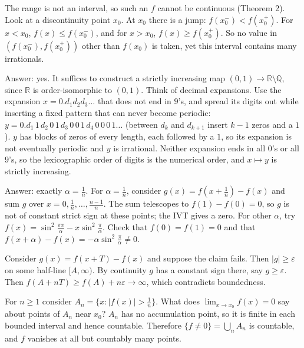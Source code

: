 \documentclass[11pt,a4paper]{article}
\begin{document}

 The range is not an interval, so such an $f$ cannot be continuous (Theorem 2). Look at a discontinuity point $x_0$.
 At $x_0$ there is a jump: $f(x_0^-)<f(x_0^+)$. For $x<x_0$, $f(x)\le f(x_0^-)$, and for $x>x_0$, $f(x)\ge f(x_0^+)$. So no value in $(f(x_0^-),f(x_0^+))$ other than $f(x_0)$ is taken, yet this interval contains many irrationals.

 Answer: yes. It suffices to construct a strictly increasing map $(0,1)\to\mathbb R\setminus\mathbb Q$, since $\mathbb R$ is order-isomorphic to $(0,1)$. Think of decimal expansions.
 Use the expansion $x=0.d_1d_2d_3\ldots$ that does not end in $9$'s, and spread its digits out while inserting a fixed pattern that can never become periodic:
$y=0.d_1\,1\,d_2\,0\,1\,d_3\,0\,0\,1\,d_4\,0\,0\,0\,1\ldots$ (between $d_k$ and $d_{k+1}$ insert $k-1$ zeros and a $1$).
 $y$ has blocks of zeros of every length, each followed by a $1$, so its expansion is not eventually periodic and $y$ is irrational. Neither expansion ends in all $0$'s or all $9$'s, so the lexicographic order of digits is the numerical order, and $x\mapsto y$ is strictly increasing.

 Answer: exactly $\alpha=\frac1n$. For $\alpha=\frac1n$, consider $g(x)=f(x+\frac1n)-f(x)$ and sum $g$ over $x=0,\frac1n,\dots,\frac{n-1}n$.
 The sum telescopes to $f(1)-f(0)=0$, so $g$ is not of constant strict sign at these points; the IVT gives a zero.
 For other $\alpha$, try $f(x)=\sin^2\frac{\pi x}{\alpha}-x\sin^2\frac{\pi}{\alpha}$. Check that $f(0)=f(1)=0$ and that $f(x+\alpha)-f(x)=-\alpha\sin^2\frac\pi\alpha\ne0$.

 Consider $g(x)=f(x+T)-f(x)$ and suppose the claim fails. Then $|g|\ge\varepsilon$ on some half-line $[A,\infty)$.
 By continuity $g$ has a constant sign there, say $g\ge\varepsilon$. Then $f(A+nT)\ge f(A)+n\varepsilon\to\infty$, which contradicts boundedness.

 For $n\ge1$ consider $A_n=\{x:|f(x)|>\frac1n\}$. What does $\lim_{x\to x_0}f(x)=0$ say about points of $A_n$ near $x_0$?
 $A_n$ has no accumulation point, so it is finite in each bounded interval and hence countable. Therefore $\{f\ne0\}=\bigcup_nA_n$ is countable, and $f$ vanishes at all but countably many points.
\end{document}
